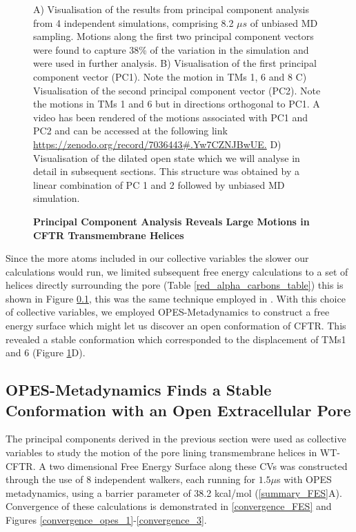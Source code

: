 \begin{figure}
	\caption[Principal Component Analysis Reveals Large Motions in CFTR Transmembrane Helices] {\textbf{Principal Component Analysis Reveals Large Motions in CFTR Transmembrane Helices}}{A) Visualisation of the results from principal component analysis from 4 independent simulations, comprising 8.2 $\mu s$ of unbiased MD sampling. Motions along the first two principal component vectors were found to capture 38\% of the variation in the simulation and were used in further analysis. B) Visualisation of the first principal component vector (PC1). Note the motion in TMs 1, 6 and 8 C) Visualisation of the second principal component vector (PC2). Note the motions in TMs 1 and 6 but in directions orthogonal to PC1. A video has been rendered of the motions associated with PC1 and PC2 and can be accessed at the following link \href{https://zenodo.org/record/7036443#.Yw7CZNJBwUE}{https://zenodo.org/record/7036443\#.Yw7CZNJBwUE.} D) Visualisation of the dilated open state which we will analyse in detail in subsequent sections. This structure was obtained by a linear combination of PC 1 and 2 followed by unbiased MD simulation. } 
	\label{PCA_motions}
\end{figure}

Since the more atoms included in our collective variables the slower our calculations would run, we limited subsequent free energy calculations to a set of helices directly surrounding the pore (Table \ref{red_alpha_carbons_table}) this is shown in Figure \ref{}, this was the same technique employed in \cite{hoffmann2018}. With this choice of collective variables, we employed OPES-Metadynamics to construct a free energy surface which might let us discover an open conformation of CFTR. This revealed a stable conformation which corresponded to the displacement of TMs1 and 6 (Figure \ref{PCA_motions}D). 

\subsection{OPES-Metadynamics Finds a Stable Conformation with an Open Extracellular Pore}

The principal components derived in the previous section were used as collective variables to study the motion of the pore lining transmembrane helices in WT-CFTR. A two dimensional Free Energy Surface along these CVs was constructed through the use of 8 independent walkers, each running for $1.5\mu$s with OPES metadynamics, using a barrier parameter of 38.2 kcal/mol (\ref{summary_FES}A). Convergence of these calculations is demonstrated in \ref{convergence_FES} and Figures \ref{convergence_opes_1}-\ref{convergence_3}. 

